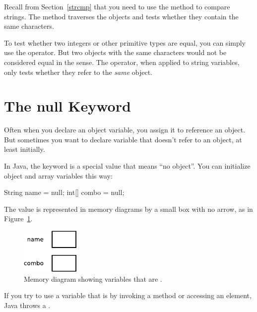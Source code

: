 
Recall from Section~\ref{strcmp} that you need to use the  method to compare strings.
The  method traverses the  objects and tests whether they contain the same characters.

To test whether two integers or other primitive types are equal, you can simply use the \java{==} operator.
But two  objects with the same characters would not be considered equal in the \java{==} sense.
The \java{==} operator, when applied to string variables, only tests whether they refer to the {\em same} object.


\section{The null Keyword}

Often when you declare an object variable, you assign it to reference an object.
But sometimes you want to declare variable that doesn't refer to an object, at least initially.


In Java, the keyword  is a special value that means ``no object''.
You can initialize object and array variables this way:

\begin{code}
String name = null;
int[] combo = null;
\end{code}

The value  is represented in memory diagrams by a small box with no arrow, as in Figure~\ref{fig.mem4}.

\begin{figure}[!ht]
\begin{center}
\includegraphics[width=80pt]{figs/mem4.pdf}
\caption{Memory diagram showing variables that are .}
\label{fig.mem4}
\end{center}
\end{figure}


If you try to use a variable that is  by invoking a method or accessing an element, Java throws a .

